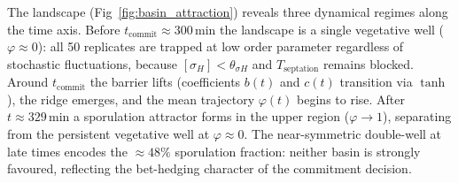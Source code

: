 \documentclass[10pt,letterpaper]{article}
\begin{document}
The landscape (Fig~\ref{fig:basin_attraction}) reveals three dynamical regimes along the time axis. Before $t_{\mathrm{commit}} \approx 300\,\mathrm{min}$ the landscape is a single vegetative well ($\varphi \approx 0$): all 50 replicates are trapped at low order parameter regardless of stochastic fluctuations, because $[\sigma_H] < \theta_{\sigma H}$ and $T_{\mathrm{septation}}$ remains blocked. Around $t_{\mathrm{commit}}$ the barrier lifts (coefficients $b(t)$ and $c(t)$ transition via $\tanh$), the ridge emerges, and the mean trajectory $\varphi(t)$ begins to rise. After $t \approx 329\,\mathrm{min}$ a sporulation attractor forms in the upper region ($\varphi \to 1$), separating from the persistent vegetative well at $\varphi \approx 0$. The near-symmetric double-well at late times encodes the ${\approx}48\%$ sporulation fraction: neither basin is strongly favoured, reflecting the bet-hedging character of the commitment decision.
\end{document}
